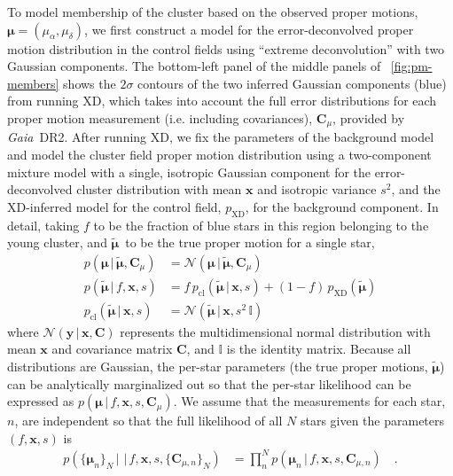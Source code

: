 \documentclass[modern]{aastex62}
\newcommand{\acronym}[1]{{\small{#1}}}
\newcommand{\gaia}{\textsl{Gaia}}
\newcommand{\DR}[1]{\acronym{DR#1}}
\newcommand{\bs}[1]{\boldsymbol{#1}}
\newcommand{\given}{\,|\,}
\newcommand{\norm}{\mathcal{N}}
\newcommand{\mat}[1]{\mathbf{#1}}
\newcommand{\truepm}{\ensuremath{\tilde{\bs{\mu}}}}
\begin{document}
To model membership of the cluster based on the observed proper motions, $\bs{\mu} = (\mu_\alpha, \mu_\delta)$, we first construct a model for the error-deconvolved proper motion distribution in the control fields using ``extreme deconvolution'' \citep[XD;][]{TODO} with two Gaussian components.
The bottom-left panel of the middle panels of \figurename~\ref{fig:pm-members} shows the $2\sigma$ contours of the two inferred Gaussian components (blue) from running XD, which takes into account the full error distributions for each proper motion measurement (i.e. including covariances), $\mat{C}_\mu$, provided by \gaia\ \DR{2}.
After running XD, we fix the parameters of the background model and model the cluster field proper motion distribution using a two-component mixture model with a single, isotropic Gaussian component for the error-deconvolved cluster distribution with mean $\bs{x}$ and isotropic variance $s^2$, and the XD-inferred model for the control field, $p_{\textrm{XD}}$, for the background component.
In detail, taking $f$ to be the fraction of blue stars in this region belonging to the young cluster, and \truepm\ to be the true proper motion for a single star,
\begin{align}
    p(\bs{\mu} \given \truepm, \mat{C}_\mu) &=
        \norm(\bs{\mu} \given \truepm, \mat{C}_\mu)\\
    p(\truepm \given f, \bs{x}, s) &=
        f \, p_{\textrm{cl}}(\truepm \given \bs{x}, s)
        + (1-f) \, p_{\textrm{XD}}(\truepm)\\
    p_{\textrm{cl}}(\truepm \given \bs{x}, s) &=
        \norm(\truepm \given \bs{x}, s^2 \, \mathbb{I})
\end{align}
where $\norm(\bs{y} \given \bs{x}, \mat{C})$ represents the multidimensional normal distribution with mean $\bs{x}$ and covariance matrix $\mat{C}$, and $\mathbb{I}$ is the identity matrix.
Because all distributions are Gaussian, the per-star parameters (the true proper motions, \truepm) can be analytically marginalized out so that the per-star likelihood can be expressed as $p(\bs{\mu} \given f, \bs{x}, s, \mat{C}_\mu)$.
We assume that the measurements for each star, $n$, are independent so that the full likelihood of all $N$ stars given the parameters $(f, \bs{x}, s)$ is
\begin{align}
    p(\{\bs{\mu}_n\}_N \given \given f, \bs{x}, s, \{\mat{C}_{\mu, n}\}_N) &=
        \prod_n^N p(\bs{\mu}_n \given f, \bs{x}, s, \mat{C}_{\mu, n}) \quad .
        \label{eq:likelihood}
\end{align}
\end{document}
